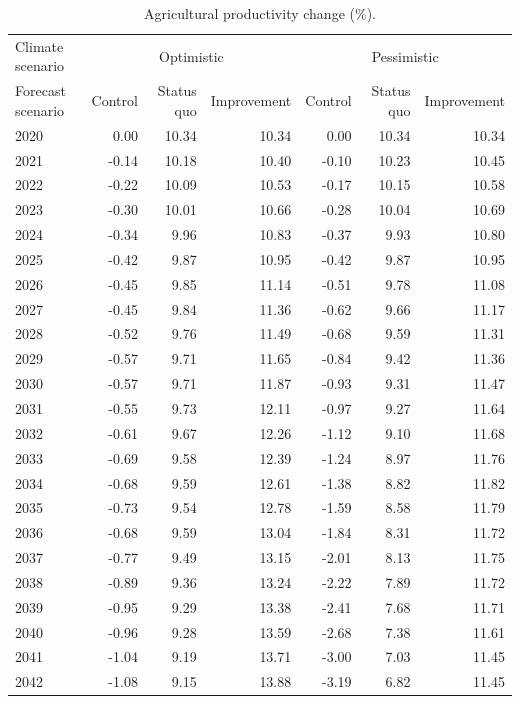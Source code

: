 \begin{table}
\caption{Agricultural productivity change (\%).}
\label{tab:agri_impact_channel_KHM}
\centering
\begin{tabular}{lrrrrrr}
\toprule
Climate scenario & \multicolumn{3}{c}{Optimistic} & \multicolumn{3}{c}{Pessimistic} \\
Forecast scenario & Control & Status quo & Improvement & Control & Status quo & Improvement \\
\midrule
2020 & 0.00 & 10.34 & 10.34 & 0.00 & 10.34 & 10.34 \\
2021 & -0.14 & 10.18 & 10.40 & -0.10 & 10.23 & 10.45 \\
2022 & -0.22 & 10.09 & 10.53 & -0.17 & 10.15 & 10.58 \\
2023 & -0.30 & 10.01 & 10.66 & -0.28 & 10.04 & 10.69 \\
2024 & -0.34 & 9.96 & 10.83 & -0.37 & 9.93 & 10.80 \\
2025 & -0.42 & 9.87 & 10.95 & -0.42 & 9.87 & 10.95 \\
2026 & -0.45 & 9.85 & 11.14 & -0.51 & 9.78 & 11.08 \\
2027 & -0.45 & 9.84 & 11.36 & -0.62 & 9.66 & 11.17 \\
2028 & -0.52 & 9.76 & 11.49 & -0.68 & 9.59 & 11.31 \\
2029 & -0.57 & 9.71 & 11.65 & -0.84 & 9.42 & 11.36 \\
2030 & -0.57 & 9.71 & 11.87 & -0.93 & 9.31 & 11.47 \\
2031 & -0.55 & 9.73 & 12.11 & -0.97 & 9.27 & 11.64 \\
2032 & -0.61 & 9.67 & 12.26 & -1.12 & 9.10 & 11.68 \\
2033 & -0.69 & 9.58 & 12.39 & -1.24 & 8.97 & 11.76 \\
2034 & -0.68 & 9.59 & 12.61 & -1.38 & 8.82 & 11.82 \\
2035 & -0.73 & 9.54 & 12.78 & -1.59 & 8.58 & 11.79 \\
2036 & -0.68 & 9.59 & 13.04 & -1.84 & 8.31 & 11.72 \\
2037 & -0.77 & 9.49 & 13.15 & -2.01 & 8.13 & 11.75 \\
2038 & -0.89 & 9.36 & 13.24 & -2.22 & 7.89 & 11.72 \\
2039 & -0.95 & 9.29 & 13.38 & -2.41 & 7.68 & 11.71 \\
2040 & -0.96 & 9.28 & 13.59 & -2.68 & 7.38 & 11.61 \\
2041 & -1.04 & 9.19 & 13.71 & -3.00 & 7.03 & 11.45 \\
2042 & -1.08 & 9.15 & 13.88 & -3.19 & 6.82 & 11.45 \\

\end{tabular}
\end{table}
